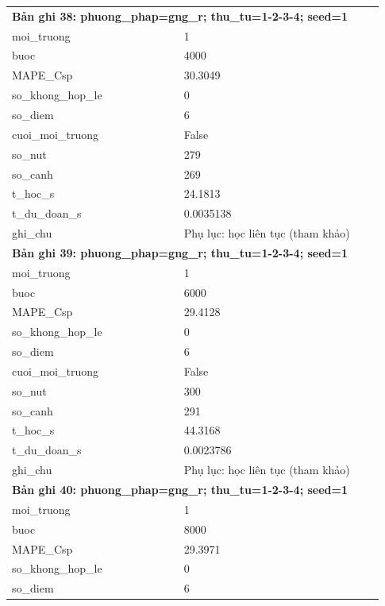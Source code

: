 \begin{longtable}{p{0.43\linewidth}p{0.50\linewidth}}
\midrule
\multicolumn{2}{p{0.95\linewidth}}{\textbf{Bản ghi 38: phuong\_phap=gng\_r; thu\_tu=1-2-3-4; seed=1}} \\
moi\_\allowbreak truong & 1 \\
buoc & 4000 \\
MAPE\_\allowbreak Csp & 30.3049 \\
so\_\allowbreak khong\_\allowbreak hop\_\allowbreak le & 0 \\
so\_\allowbreak diem & 6 \\
cuoi\_\allowbreak moi\_\allowbreak truong & False \\
so\_\allowbreak nut & 279 \\
so\_\allowbreak canh & 269 \\
t\_\allowbreak hoc\_\allowbreak s & 24.1813 \\
t\_\allowbreak du\_\allowbreak doan\_\allowbreak s & 0.0035138 \\
ghi\_\allowbreak chu & Phụ lục: học liên tục (tham khảo) \\
\midrule
\multicolumn{2}{p{0.95\linewidth}}{\textbf{Bản ghi 39: phuong\_phap=gng\_r; thu\_tu=1-2-3-4; seed=1}} \\
moi\_\allowbreak truong & 1 \\
buoc & 6000 \\
MAPE\_\allowbreak Csp & 29.4128 \\
so\_\allowbreak khong\_\allowbreak hop\_\allowbreak le & 0 \\
so\_\allowbreak diem & 6 \\
cuoi\_\allowbreak moi\_\allowbreak truong & False \\
so\_\allowbreak nut & 300 \\
so\_\allowbreak canh & 291 \\
t\_\allowbreak hoc\_\allowbreak s & 44.3168 \\
t\_\allowbreak du\_\allowbreak doan\_\allowbreak s & 0.0023786 \\
ghi\_\allowbreak chu & Phụ lục: học liên tục (tham khảo) \\
\midrule
\multicolumn{2}{p{0.95\linewidth}}{\textbf{Bản ghi 40: phuong\_phap=gng\_r; thu\_tu=1-2-3-4; seed=1}} \\
moi\_\allowbreak truong & 1 \\
buoc & 8000 \\
MAPE\_\allowbreak Csp & 29.3971 \\
so\_\allowbreak khong\_\allowbreak hop\_\allowbreak le & 0 \\
so\_\allowbreak diem & 6 \\

\end{longtable}
